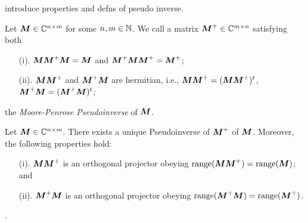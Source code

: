 \TODO introduce properties and defns of pseudo inverse.

\begin{definition}
\label{def:pseudoinverse}
Let ${\vb*{M}}\in\mathbb{C}^{n\times m}$ for some $n,m\in\mathbb{N}$. We call a matrix ${\vb*{M}}^+\in\mathbb{C}^{m\times n}$ satisfying both
\begin{enumerate}
    \item[(i).] ${\vb*{M}}{\vb*{M}}^+{\vb*{M}}={\vb*{M}}$ and ${\vb*{M}}^+{\vb*{M}}{\vb*{M}}^+={\vb*{M}}^+$;
    \item[(ii).] ${\vb*{M}}{\vb*{M}}^+$ and ${\vb*{M}}^+{\vb*{M}}$ are hermitian, i.e., ${\vb*{M}}{\vb*{M}}^+=({\vb*{M}}{\vb*{M}}^+)^t $, ${\vb*{M}}^+{\vb*{M}}=({\vb*{M}}^+{\vb*{M}})^t$; 
\end{enumerate}
the \emph{Moore-Penrose Pseudoinverse} of ${\vb*{M}}$. 
\end{definition}

\begin{lemma}
	\label{lem:pseudoinverse_properties}
Let ${\vb*{M}}\in \mathbb{C}^{n\times m}$. There exists a unique Pseudoinverse of ${\vb*{M}}^+$ of ${\vb*{M}}$. Moreover, the following properties hold: 
\begin{enumerate}
    \item[(i).] ${\vb*{M}}{\vb*{M}}^+$ is an orthogonal projector obeying $\textnormal{range}({\vb*{M}}{\vb*{M}}^+)=\textnormal{range}({\vb*{M}})$; and 
    \item[(ii).] ${\vb*{M}}^+{\vb*{M}}$ is an orthogonal projector obeying $\textnormal{range}({\vb*{M}}^+{\vb*{M}})=\textnormal{range}({\vb*{M}}^+)$. 
\end{enumerate}
\end{lemma}

. 

